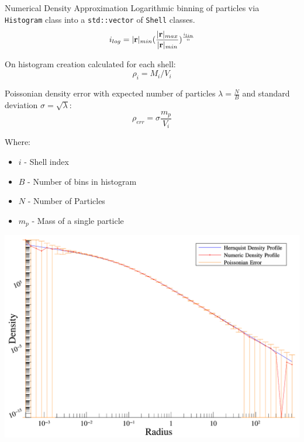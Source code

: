 \begin{frame}{Numerical Density Approximation}
	Logarithmic binning of particles via \texttt{Histogram} class into a \texttt{std::vector} of \texttt{Shell}
	classes.
	\begin{equation}
		i_{log} = |\vb{r}|_{min} (\frac{|\vb{r}|_{max}}{|\vb{r}|_{min}})^{\frac {i_{lin}}{n}}
	\end{equation}

	On histogram creation calculated for each shell:
	\begin{equation}
		\rho_i = M_i / V_i
	\end{equation}

	Poissonian density error with expected number of particles $\lambda = \frac{N}{B}$ and standard deviation
	$\sigma = \sqrt{\lambda}$:
	\begin{equation}
		\rho_{err} = \sigma \frac{m_p}{V_i}
	\end{equation}

	{\footnotesize
	Where:
	\begin{itemize}
		\item $i$ - Shell index
		\item $B$ - Number of bins in histogram
		\item $N$ - Number of Particles
		\item $m_p$ - Mass of a single particle
	\end{itemize}
	}
\end{frame}


\begin{frame}
	\includegraphics[width=1\textwidth]{figures/plots/hernquist.png}
\end{frame}


